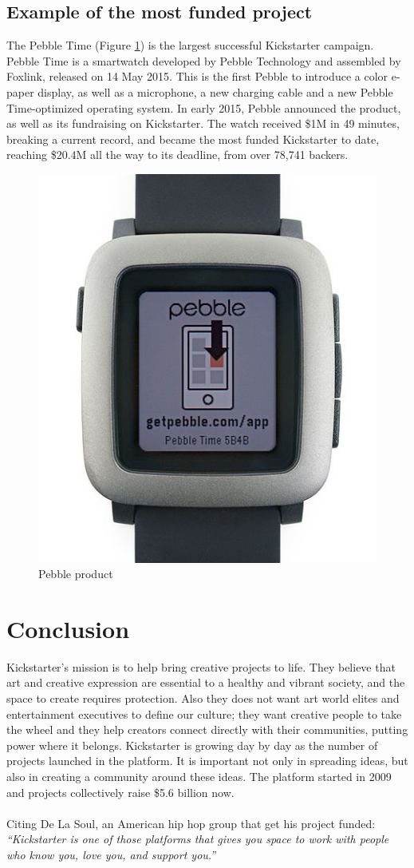 \documentclass{report}
\begin{document}
\section{Example of the most funded project}
The Pebble Time (Figure \ref{fig:peb}) is the largest successful Kickstarter campaign.
Pebble Time is a smartwatch developed by Pebble Technology and assembled by Foxlink, released on 14 May 2015. This is the first Pebble to introduce a color e-paper display, as well as a microphone, a new charging cable and a new Pebble Time-optimized operating system.
In early 2015, Pebble announced the product, as well as its fundraising on Kickstarter. The watch received \$1M in 49 minutes, breaking a current record, and became the most funded Kickstarter to date, reaching \$20.4M all the way to its deadline, from over 78,741 backers.
\begin{figure}
    \centering
    \includegraphics[width=0.2\linewidth]{figuras/pebble.jpg}
    \caption{Pebble product}
    \label{fig:peb}
\end{figure}

\chapter{Conclusion}\label{conclusion}
Kickstarter's mission is to help bring creative projects to life. They believe that art and creative expression are essential to a healthy and vibrant society, and the space to create requires protection. Also they does not want art world elites and entertainment executives to define our culture; they want creative people to take the wheel and they help creators connect directly with their communities, putting power where it belongs.
Kickstarter is growing day by day as the number of projects launched in the platform. It is important not only in spreading ideas, but also in creating a community around these ideas. The platform started in 2009 and projects collectively raise \$5.6 billion now. 
\\\\
Citing De La Soul, an American hip hop group that get his project funded: \textit{“Kickstarter is one of those platforms that gives you space to work with people who know you, love you, and support you.”}
\end{document}
